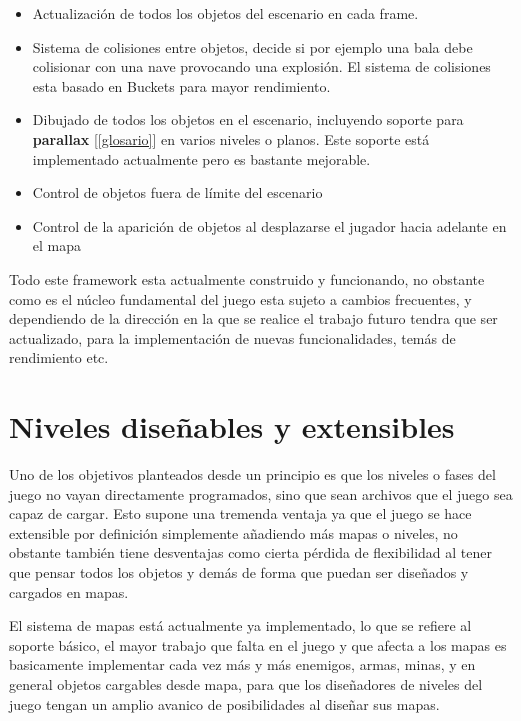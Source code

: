 \begin{itemize}

\item Actualización de todos los objetos del escenario en cada frame.

\item Sistema de colisiones entre objetos, decide si por ejemplo una bala debe colisionar con una nave provocando una explosión. El sistema de colisiones esta basado en Buckets para mayor rendimiento.

\item Dibujado de todos los objetos en el escenario, incluyendo soporte para \textbf{parallax} [\ref{glosario}] en varios niveles o planos. Este soporte está implementado actualmente pero es bastante mejorable.

\item Control de objetos fuera de límite del escenario

\item Control de la aparición de objetos al desplazarse el jugador hacia adelante en el mapa

\end{itemize}

Todo este framework esta actualmente construido y funcionando, no obstante como es el núcleo fundamental del juego esta sujeto a cambios frecuentes, y dependiendo de la dirección en la que se realice el trabajo futuro tendra que ser actualizado, para la implementación de nuevas funcionalidades, temás de rendimiento etc.

\section{Niveles diseñables y extensibles}

Uno de los objetivos planteados desde un principio es que los niveles o fases del juego no vayan directamente programados, sino que sean archivos que el juego sea capaz de cargar. Esto supone una tremenda ventaja ya que el juego se hace extensible por definición simplemente añadiendo más mapas o niveles, no obstante también tiene desventajas como cierta pérdida de flexibilidad al tener que pensar todos los objetos y demás de forma que puedan ser diseñados y cargados en mapas.

El sistema de mapas está actualmente ya implementado, lo que se refiere al soporte básico, el mayor trabajo que falta en el juego y que afecta a los mapas es basicamente implementar cada vez más y más enemigos, armas, minas, y en general objetos cargables desde mapa, para que los diseñadores de niveles del juego tengan un amplio avanico de posibilidades al diseñar sus mapas.

